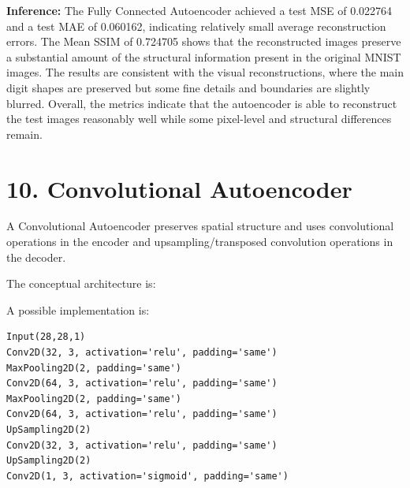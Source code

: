 \documentclass[10pt]{article}
\begin{document}
\textbf{Inference:} The Fully Connected Autoencoder achieved a test MSE of 0.022764 and a test MAE of 0.060162, indicating relatively small average reconstruction errors. The Mean SSIM of 0.724705 shows that the reconstructed images preserve a substantial amount of the structural information present in the original MNIST images. The results are consistent with the visual reconstructions, where the main digit shapes are preserved but some fine details and boundaries are slightly blurred. Overall, the metrics indicate that the autoencoder is able to reconstruct the test images reasonably well while some pixel-level and structural differences remain.
\section*{10. Convolutional Autoencoder}

A Convolutional Autoencoder preserves spatial structure and uses convolutional
operations in the encoder and upsampling/transposed convolution operations
in the decoder.

The conceptual architecture is:

\begin{center}
\end{center}

A possible implementation is:

\begin{verbatim}
Input(28,28,1)
Conv2D(32, 3, activation='relu', padding='same')
MaxPooling2D(2, padding='same')
Conv2D(64, 3, activation='relu', padding='same')
MaxPooling2D(2, padding='same')
Conv2D(64, 3, activation='relu', padding='same')
UpSampling2D(2)
Conv2D(32, 3, activation='relu', padding='same')
UpSampling2D(2)
Conv2D(1, 3, activation='sigmoid', padding='same')
\end{verbatim}
\end{document}
